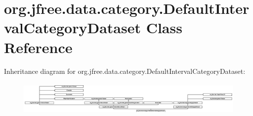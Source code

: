 \hypertarget{classorg_1_1jfree_1_1data_1_1category_1_1_default_interval_category_dataset}{}\section{org.\+jfree.\+data.\+category.\+Default\+Interval\+Category\+Dataset Class Reference}
\label{classorg_1_1jfree_1_1data_1_1category_1_1_default_interval_category_dataset}
Inheritance diagram for org.\+jfree.\+data.\+category.\+Default\+Interval\+Category\+Dataset\+:\begin{figure}[H]
\begin{center}
\leavevmode
\includegraphics[height=1.691843cm]{classorg_1_1jfree_1_1data_1_1category_1_1_default_interval_category_dataset}
\end{center}
\end{figure}
